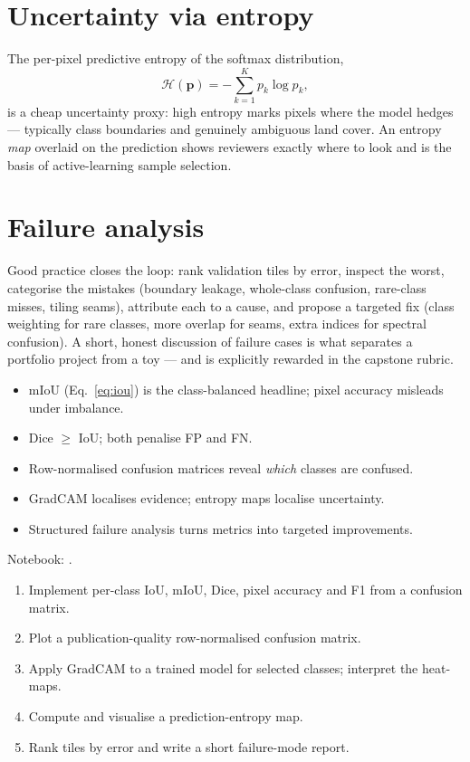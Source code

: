 \section{Uncertainty via entropy}

The per-pixel predictive entropy of the softmax distribution,
\begin{equation}
\mathcal{H}(\mathbf{p}) = -\sum_{k=1}^{K} p_k \log p_k,
\end{equation}
is a cheap uncertainty proxy: high entropy marks pixels where the model hedges
--- typically class boundaries and genuinely ambiguous land cover. An entropy
\emph{map} overlaid on the prediction shows reviewers exactly where to look and
is the basis of active-learning sample selection.

\section{Failure analysis}

Good practice closes the loop: rank validation tiles by error, inspect the worst,
categorise the mistakes (boundary leakage, whole-class confusion, rare-class
misses, tiling seams), attribute each to a cause, and propose a targeted fix
(class weighting for rare classes, more overlap for seams, extra indices for
spectral confusion). A short, honest discussion of failure cases is what
separates a portfolio project from a toy --- and is explicitly rewarded in the
capstone rubric.

\begin{keybox}
\begin{itemize}[leftmargin=1.2em,nosep]
  \item mIoU (Eq.~\ref{eq:iou}) is the class-balanced headline; pixel accuracy misleads under imbalance.
  \item Dice $\ge$ IoU; both penalise FP and FN.
  \item Row-normalised confusion matrices reveal \emph{which} classes are confused.
  \item GradCAM localises evidence; entropy maps localise uncertainty.
  \item Structured failure analysis turns metrics into targeted improvements.
\end{itemize}
\end{keybox}

\begin{practbox}
Notebook: .
\begin{enumerate}[leftmargin=1.4em,nosep]
  \item Implement per-class IoU, mIoU, Dice, pixel accuracy and F1 from a confusion matrix.
  \item Plot a publication-quality row-normalised confusion matrix.
  \item Apply GradCAM to a trained model for selected classes; interpret the heat-maps.
  \item Compute and visualise a prediction-entropy map.
  \item Rank tiles by error and write a short failure-mode report.
\end{enumerate}
\end{practbox}

